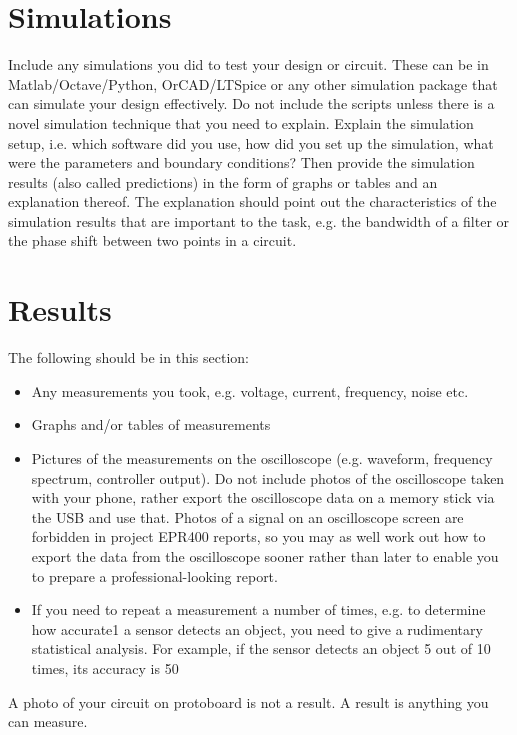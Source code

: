 \documentclass[a4paper,12pt]{report}
\begin{document}
\section{Simulations}

Include any simulations you did to test your design or circuit. These can be in Matlab/Octave/Python, OrCAD/LTSpice or any other simulation package that can simulate your design effectively. Do not include the scripts unless there is a novel simulation technique that you need to explain. Explain the simulation setup, i.e. which software did you use, how did you set up the simulation, what were the parameters and boundary conditions? Then provide the simulation results (also called predictions) in the form of graphs or tables and an explanation thereof. The explanation should point out the characteristics of the simulation results that are important to the task, e.g. the bandwidth of a filter or the phase shift between two points in a circuit.

\section{Results}

The following should be in this section:

\begin{itemize}
\item Any measurements you took, e.g. voltage, current, frequency, noise etc.
\item Graphs and/or tables of measurements
\item Pictures of the measurements on the oscilloscope (e.g. waveform, frequency spectrum, controller output). Do not include photos of the oscilloscope taken with your phone, rather export the oscilloscope data on a memory stick via the USB and use that. Photos of a signal on an oscilloscope screen are forbidden in project EPR400 reports, so you may as well work out how to export the data from the oscilloscope sooner rather than later to enable you to prepare a professional-looking report.
\item If you need to repeat a measurement a number of times, e.g. to determine how accurate1 a sensor detects an object, you need to give a rudimentary statistical analysis. For example, if the sensor detects an object 5 out of 10 times, its accuracy is 50%
\end{itemize}
A photo of your circuit on protoboard is not a result. A result is anything you can measure. 
\end{document}
